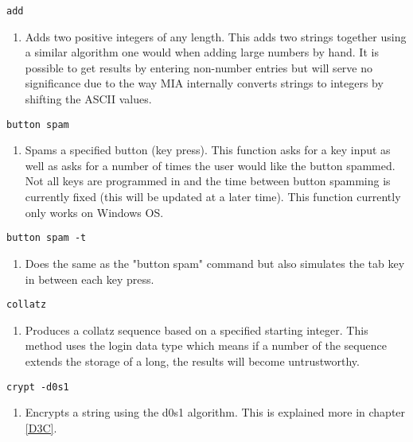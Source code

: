 \begin{lstlisting} 
add   
\end{lstlisting}
\begin{enumerate}
	\item[] Adds two positive integers of any length. This adds two strings together using a similar algorithm one would when adding large numbers by hand. It is possible to get results by entering non-number entries but will serve no significance due to the way MIA internally converts strings to integers by shifting the ASCII values.
\end{enumerate}

\begin{lstlisting} 
button spam
\end{lstlisting}
\begin{enumerate}
	\item[] Spams a specified button (key press). This function asks for a key input as well as asks for a number of times the user would like the button spammed. Not all keys are programmed in and the time between button spamming is currently fixed (this will be updated at a later time). This function currently only works on Windows OS.
\end{enumerate}

\index{}
\begin{lstlisting} 
button spam -t
\end{lstlisting}
\begin{enumerate}
	\item[] Does the same as the "button spam" command but also simulates the tab key in between each key press.
\end{enumerate}

\begin{lstlisting} 
collatz   
\end{lstlisting}
\begin{enumerate}
	\item[] Produces a collatz sequence based on a specified starting integer. This method uses the login data type which means if a number of the sequence extends the storage of a long, the results will become untrustworthy. 
\end{enumerate}

\begin{lstlisting} 
crypt -d0s1   
\end{lstlisting}
\begin{enumerate}
	\item[] Encrypts a string using the d0s1 algorithm. This is explained more in chapter \ref{D3C}.
\end{enumerate}

